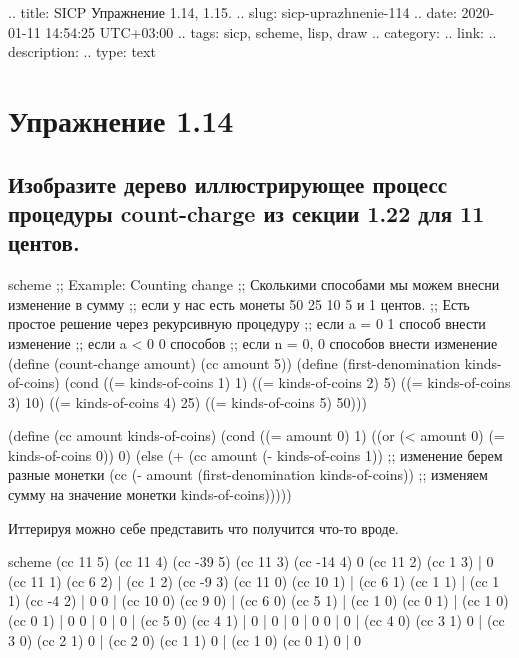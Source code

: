 .. title: SICP Упражнение 1.14, 1.15.
.. slug: sicp-uprazhnenie-114
.. date: 2020-01-11 14:54:25 UTC+03:00
.. tags: sicp, scheme, lisp, draw
.. category: 
.. link: 
.. description: 
.. type: text

\chapter{Упражнение 1.14}

\section{Изобразите дерево иллюстрирующее процесс процедуры count-charge из секции 1.22 для 11 центов.}

\begin{codelisting}{scheme}
;; Example: Counting change
;; Сколькими способами мы можем внесни изменение в сумму
;; если у нас есть монеты 50 25 10 5 и 1 центов.
;; Есть простое решение через рекурсивную процедуру
;; если a = 0 1 способ внести изменение
;; если a < 0 0 способов
;; если n = 0, 0 способов внести изменение
(define (count-change amount)
  (cc amount 5))
(define (first-denomination kinds-of-coins)
  (cond ((= kinds-of-coins 1) 1)
        ((= kinds-of-coins 2) 5)
        ((= kinds-of-coins 3) 10)
        ((= kinds-of-coins 4) 25)
        ((= kinds-of-coins 5) 50)))

(define (cc amount kinds-of-coins)
  (cond ((= amount 0) 1)
        ((or (< amount 0) (= kinds-of-coins 0)) 0)
        (else (+ (cc amount
                     (- kinds-of-coins 1)) ;; изменение берем разные монетки
                 (cc (- amount
                        (first-denomination kinds-of-coins)) ;; изменяем сумму на значение монетки
                     kinds-of-coins)))))
\end{codelisting}

Иттерируя можно себе представить что получится что-то вроде.
\begin{codelisting}{scheme}
                            (cc 11 5)
                     (cc 11 4)     (cc -39 5)
                (cc 11 3) (cc -14 4)      0
           (cc 11 2) (cc 1 3) | 0
      (cc 11 1) (cc 6 2) | (cc 1 2) (cc -9 3)
 (cc 11 0) (cc 10 1) | (cc 6 1) (cc 1 1) | (cc 1 1) (cc -4 2) | 0
    0 | (cc 10 0) (cc 9 0) | (cc 6 0) (cc 5 1) | (cc 1 0) (cc 0 1) | (cc 1 0) (cc 0 1) | 0
          0 | 0 | 0 | (cc 5 0) (cc 4 1) | 0 | 0 | 0 | 0
          0 | 0 | (cc 4 0) (cc 3 1)
          0 | (cc 3 0) (cc 2 1)
          0 | (cc 2 0) (cc 1 1)
          0 | (cc 1 0) (cc 0 1)
          0 | 0
\end{codelisting}

